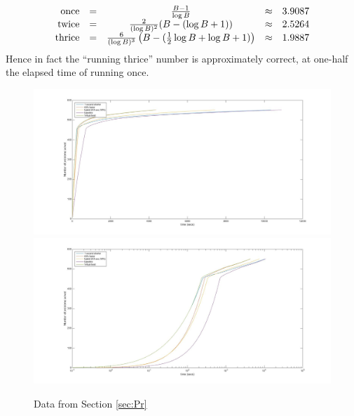 \documentclass{easychair}
\begin{document}
\begin{equation*}
\begin{array}{rcccl}
\hbox{once}&=&\frac{B-1}{\log B}&\approx&3.9087\\
\hbox{twice}&=&\frac{2}{(\log B)^2}(B-(\log B +1))&\approx&2.5264\\
\hbox{thrice}&=&\frac{6}{(\log B)^3}\left(B-(\frac12\log B+\log B +1)\right)&\approx&1.9887\\
\end{array}
\end{equation*}
Hence in fact the ``running thrice'' number is approximately correct, at one-half the elapsed time of running once.

\begin{figure}[h]
\caption{Data from Section \ref{sec:Pr}\label{Fig:S2}}
\hbox{\hskip-60pt\includegraphics[scale=0.35]{Fig2a.jpg}}
\hbox{\hskip-60pt\includegraphics[scale=0.35]{Fig2b.jpg}}
\end{figure}
\clearpage
\end{document}
